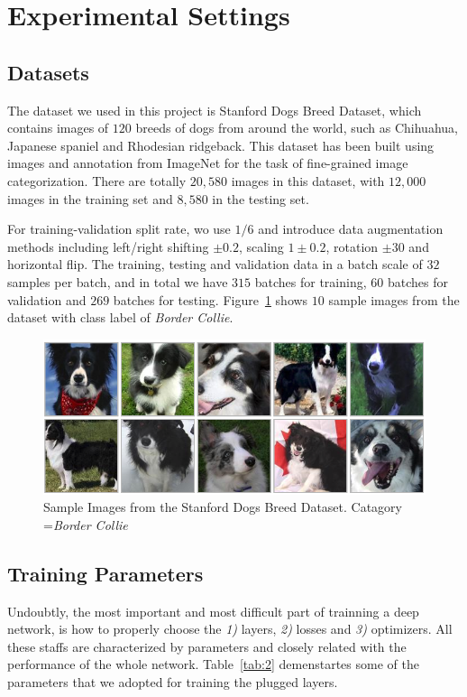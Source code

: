 \documentclass{article}
\begin{document}
\newpage
\section{Experimental Settings}

\subsection{Datasets}
The dataset we used in this project is Stanford Dogs Breed Dataset, which contains images of $120$ breeds of dogs from around the world, such as Chihuahua, Japanese spaniel and Rhodesian ridgeback. This dataset has been built using images and annotation from ImageNet for the task of fine-grained image categorization. There are totally $20,580$ images in this dataset, with $12,000$ images in the training set and $8,580$ in the testing set.

For training-validation split rate, wo use $1/6$ and introduce data augmentation methods including left/right shifting $\pm 0.2$, scaling $1 \pm 0.2$, rotation $\pm 30$ and horizontal flip. 
The training, testing and validation data in a batch scale of $32$ samples per batch, and in total we have $315$ batches for training, $60$ batches for validation and $269$ batches for testing. Figure~\ref{fig:5} shows $10$ sample images from the dataset with class label of \emph{Border Collie}. 

\begin{figure}[H]
	\centering
	\includegraphics[width=0.7\linewidth]{pics/dogs} 
	\caption{Sample Images from the Stanford Dogs Breed Dataset. Catagory =\emph{Border Collie} }
	\label{fig:5}
\end{figure}

\subsection{Training Parameters}
Undoubtly, the most important and most difficult part of trainning a deep network, is how to properly choose the \emph{1)} layers, \emph{2)} losses and \emph{3)} optimizers. All these staffs are characterized by parameters and closely related with the performance of the whole network. 
Table~\ref{tab:2} demenstartes some of the parameters that we adopted for training the plugged layers. 
\end{document}
